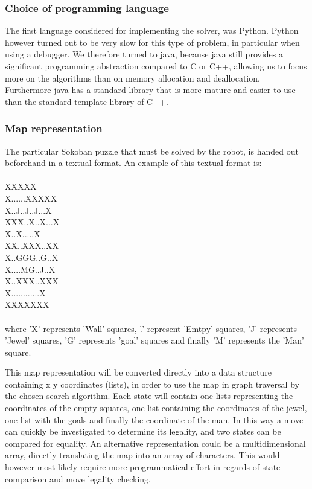 \subsubsection{Choice of programming language}
The first language considered for implementing the solver, was Python. Python however turned out to be very slow for this type of problem, in particular when using a debugger. We therefore turned to java, because java still provides a significant programming abstraction compared to C or C++, allowing us to focus more on the algorithms than on memory allocation and deallocation. Furthermore java has a standard library that is more mature and easier to use than the standard template library of C++. 

\subsubsection{Map representation}
The particular Sokoban puzzle that must be solved by the robot, is handed out beforehand in a textual format. An example of this textual format is:
\\\\
XXXXX\\  
X......XXXXX\\ 
X..J..J..J...X\\  
XXX..X..X...X\\   
\hspace*{6 mm}X..X.....X\\  
\hspace*{3 mm}XX..XXX..XX\\        
\hspace*{3 mm}X..GGG..G..X\\ 
\hspace*{3 mm}X....MG..J..X\\  
\hspace*{3 mm}X..XXX..XXX\\     
\hspace*{3 mm}X............X\\
\hspace*{3 mm}XXXXXXX  
\\\\ 
where 'X' represents 'Wall' squares, '.' represent 'Emtpy' squares, 'J' represents 'Jewel' squares, 'G' represents 'goal' squares and finally 'M' represents the 'Man' square. 

This map representation will be converted directly into a data structure containing x y coordinates (lists), in order to use the map in graph traversal by the chosen search algorithm. Each state will contain one lists representing the coordinates of the empty squares, one list containing the coordinates of the jewel, one list with the goals and finally the coordinate of the man. In this way a move can quickly be investigated to determine its legality, and two states can be compared for equality.
An alternative representation could be a multidimensional array, directly translating the map into an array of characters. This would however most likely require more programmatical effort in regards of state comparison and move legality checking.

